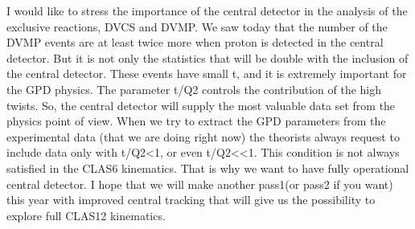 I would like to stress the importance of the central detector in the analysis of the exclusive reactions, DVCS and DVMP. We saw today that the number of the DVMP events are at least twice  more when  proton is detected in the central detector.  But it is not only the statistics that will be double with the inclusion of the central detector. These events have small t, and it is extremely important for the GPD physics. The parameter t/Q2 controls the contribution of  the high twists. So, the central detector will supply the most valuable data set from the physics point of view. When we try to extract the GPD parameters from the experimental data (that we are doing right now) the theorists always request to include data only with t/Q2<1, or even t/Q2<<1. This condition is not always satisfied in the CLAS6 kinematics. That is why we want to have fully operational central detector. I hope that we will make another pass1(or pass2 if you want) this year with improved central tracking that will give us the possibility to explore full CLAS12 kinematics.

